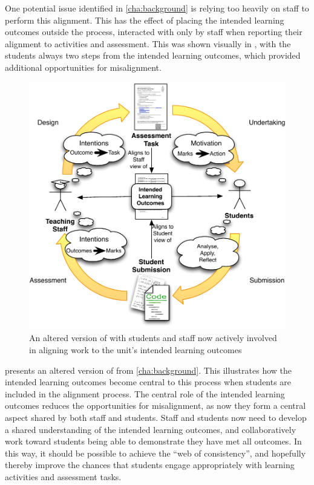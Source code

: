 One potential issue identified in \cref{cha:background} is relying too heavily on staff to perform this alignment. This has the effect of placing the intended learning outcomes outside the process, interacted with only by staff when reporting their alignment to activities and assessment. This was shown visually in , with the students always two steps from the intended learning outcomes, which provided additional opportunities for misalignment.

\begin{figure}[htbp]
	\centering
	\includegraphics[width=\textwidth]{Alignment}
	\caption{An altered version of  with students and staff now actively involved in aligning work to the unit's intended learning outcomes}
	\label{fig:alignment}
\end{figure}

 presents an altered version of  from \cref{cha:background}. This illustrates how the intended learning outcomes become central to this process when students are included in the alignment process. The central role of the intended learning outcomes reduces the opportunities for misalignment, as now they form a central aspect shared by both staff and students. Staff and students now need to develop a shared understanding of the intended learning outcomes, and collaboratively work toward students being able to demonstrate they have met all outcomes. In this way, it should be possible to achieve the ``web of consistency'', and hopefully thereby improve the chances that students engage appropriately with learning activities and assessment tasks. 

